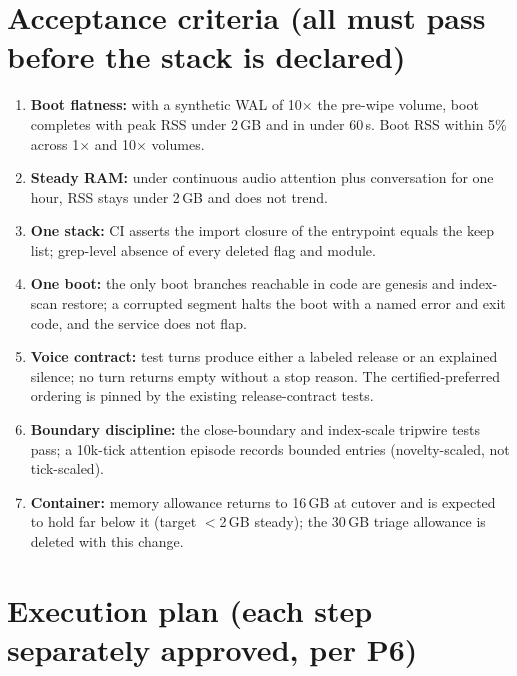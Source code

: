\documentclass[11pt]{article}
\begin{document}
\section{Acceptance criteria (all must pass before the stack is declared)}
\label{sec:accept}

\begin{enumerate}[nosep]
  \item \textbf{Boot flatness:} with a synthetic WAL of 10$\times$ the
        pre-wipe volume, boot completes with peak RSS under 2\,GB and in
        under 60\,s. Boot RSS within 5\% across 1$\times$ and 10$\times$
        volumes.
  \item \textbf{Steady RAM:} under continuous audio attention plus
        conversation for one hour, RSS stays under 2\,GB and does not trend.
  \item \textbf{One stack:} CI asserts the import closure of the entrypoint
        equals the keep list; grep-level absence of every deleted flag and
        module.
  \item \textbf{One boot:} the only boot branches reachable in code are
        genesis and index-scan restore; a corrupted segment halts the boot
        with a named error and exit code, and the service does not flap.
  \item \textbf{Voice contract:} test turns produce either a labeled release
        or an explained silence; no turn returns empty without a stop
        reason. The certified-preferred ordering is pinned by the existing
        release-contract tests.
  \item \textbf{Boundary discipline:} the close-boundary and index-scale
        tripwire tests pass; a 10k-tick attention episode records bounded
        entries (novelty-scaled, not tick-scaled).
  \item \textbf{Container:} memory allowance returns to 16\,GB at cutover
        and is expected to hold far below it (target $<$2\,GB steady); the
        30\,GB triage allowance is deleted with this change.
\end{enumerate}

\section{Execution plan (each step separately approved, per P6)}
\end{document}

